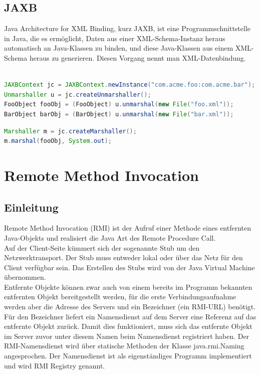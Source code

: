 \documentclass[10pt]{article}
\begin{document}
\subsection{JAXB}
Java Architecture for XML Binding, kurz JAXB, ist eine Programmschnittstelle in Java, die es ermöglicht, Daten aus einer XML-Schema-Instanz heraus automatisch an Java-Klassen zu binden, und diese Java-Klassen aus einem XML-Schema heraus zu generieren. Diesen Vorgang nennt man XML-Datenbindung.
\begin{lstlisting}[language=Java, caption=Unmarshalling, style=JavaStyle]

JAXBContext jc = JAXBContext.newInstance("com.acme.foo:com.acme.bar");
Unmarshaller u = jc.createUnmarshaller();
FooObject fooObj = (FooObject) u.unmarshal(new File("foo.xml"));
BarObject barObj = (BarObject) u.unmarshal(new File("bar.xml"));
\end{lstlisting}

\begin{lstlisting}[language=Java, caption=Marshalling, style=JavaStyle]
Marshaller m = jc.createMarshaller();
m.marshal(fooObj, System.out);
\end{lstlisting}

\newpage
\section{Remote Method Invocation}
\subsection{Einleitung}
Remote Method Invocation (RMI) ist der Aufruf einer Methode eines entfernten Java-Objekts und realisiert die Java Art des Remote Procedure Call.\\
Auf der Client-Seite kümmert sich der sogenannte Stub um den Netzwerktransport. Der Stub muss entweder lokal oder über das Netz für den Client verfügbar sein. Das Erstellen des Stubs wird von der Java Virtual Machine übernommen. \\
Entfernte Objekte können zwar auch von einem bereits im Programm bekannten entfernten Objekt bereitgestellt werden, für die erste Verbindungsaufnahme werden aber die Adresse des Servers und ein Bezeichner (ein RMI-URL) benötigt. Für den Bezeichner liefert ein Namensdienst auf dem Server eine Referenz auf das entfernte Objekt zurück. Damit dies funktioniert, muss sich das entfernte Objekt im Server zuvor unter diesem Namen beim Namensdienst registriert haben. Der RMI-Namensdienst wird über statische Methoden der Klasse java.rmi.Naming angesprochen. Der Namensdienst ist als eigenständiges Programm implementiert und wird RMI Registry genannt.
\end{document}
